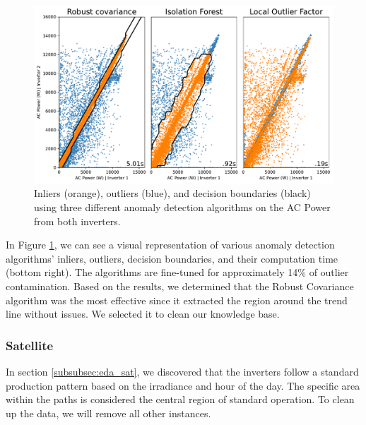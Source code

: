 \begin{figure}[h!]
    \centering
    \includegraphics[width=\textwidth]{figures/chapter5/cleaning/20_cleaning_power.pdf}
    \caption{Inliers (orange), outliers (blue), and decision boundaries (black) using three different anomaly detection algorithms on the AC Power from both inverters.}
    \label{fig:clean_power}
\end{figure}

In Figure \ref{fig:clean_power}, we can see a visual representation of various anomaly detection algorithms' inliers, outliers, decision boundaries, and their computation time (bottom right). The algorithms are fine-tuned for approximately 14\% of outlier contamination. Based on the results, we determined that the Robust Covariance algorithm was the most effective since it extracted the region around the trend line without issues. We selected it to clean our knowledge base.

\subsubsection{Satellite}

In section \ref{subsubsec:eda_sat}, we discovered that the inverters follow a standard production pattern based on the irradiance and hour of the day. The specific area within the paths is considered the central region of standard operation. To clean up the data, we will remove all other instances.

